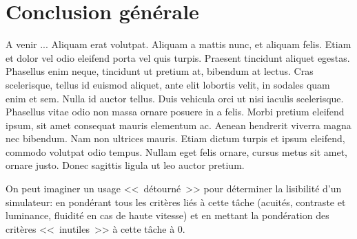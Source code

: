 \chapter*{Conclusion générale}

\lettrine[lines=3]{A}{} venir ... Aliquam erat volutpat. Aliquam a mattis nunc, et aliquam felis. Etiam et dolor vel odio eleifend porta vel quis turpis. Praesent tincidunt aliquet egestas. Phasellus enim neque, tincidunt ut pretium at, bibendum at lectus. Cras scelerisque, tellus id euismod aliquet, ante elit lobortis velit, in sodales quam enim et sem. Nulla id auctor tellus. Duis vehicula orci ut nisi iaculis scelerisque. Phasellus vitae odio non massa ornare posuere in a felis. Morbi pretium eleifend ipsum, sit amet consequat mauris elementum ac. Aenean hendrerit viverra magna nec bibendum. Nam non ultrices mauris. Etiam dictum turpis et ipsum eleifend, commodo volutpat odio tempus. Nullam eget felis ornare, cursus metus sit amet, ornare justo. Donec sagittis ligula ut leo auctor pretium. 

\par On peut imaginer un usage <<~détourné~>> pour déterminer la lisibilité d'un simulateur: en pondérant tous les critères liés à cette tâche (acuités, contraste et luminance, fluidité en cas de  haute vitesse) et en mettant la pondération des critères <<~inutiles~>> à cette tâche à 0.